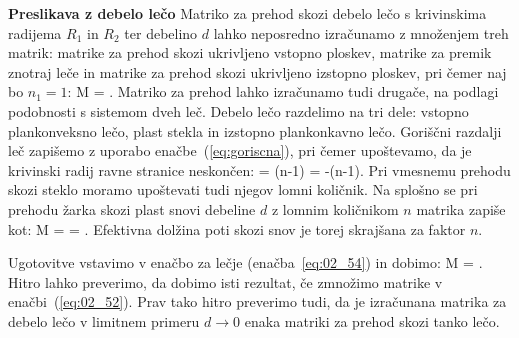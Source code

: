 \begin{example}{\bf Preslikava z debelo lečo}
Matriko za prehod skozi debelo lečo s krivinskima radijema
$R_1$ in $R_2$ ter debelino $d$ lahko neposredno izračunamo
z množenjem treh matrik: matrike za prehod skozi ukrivljeno vstopno 
ploskev, matrike za premik znotraj leče in matrike za prehod skozi 
ukrivljeno izstopno ploskev, pri čemer naj bo $n_1 = 1$:
\beq
M = 
\cdot
\left[\begin{array}{cc}
1& d\\
0&1
\end{array}\right]
\cdot
{}\!\!.
\label{eq:02_52}
\eeq
Matriko za prehod lahko izračunamo tudi drugače, na podlagi podobnosti 
s sistemom dveh leč. Debelo lečo razdelimo
na tri dele: vstopno plankonveksno lečo, plast stekla in izstopno plankonkavno lečo.
Goriščni razdalji leč zapišemo z uporabo enačbe~(\ref{eq:goriscna}), pri čemer upoštevamo, 
da je krivinski radij ravne stranice neskončen:
\beq
{} = (n-1)\qquad {} \qquad {} = -(n-1).
\label{eq:02_53}
\eeq
Pri vmesnemu prehodu skozi steklo moramo upoštevati tudi njegov
lomni količnik. Na splošno se pri prehodu žarka skozi plast snovi debeline $d$
z lomnim količnikom $n$ matrika zapiše kot:
\beq
M = 
\left[\begin{array}{cc}
1& 0\\
0&n
\end{array}\right]\cdot
\left[\begin{array}{cc}
1& d\\
0&1
\end{array}\right]\cdot
{} = 
\!\!.
\label{eq:02_54a}
\eeq
Efektivna dolžina poti skozi snov je torej skrajšana za faktor $n$.

Ugotovitve vstavimo v enačbo za lečje (enačba~\ref{eq:02_54}) in dobimo:
\beq
M = 
\!\!.
\label{eq:02_53a}
\eeq
Hitro lahko preverimo, da dobimo isti rezultat, če zmnožimo matrike v enačbi~(\ref{eq:02_52}).
Prav tako hitro preverimo tudi, da je izračunana matrika za debelo lečo v limitnem 
primeru $d \to 0$ enaka matriki za prehod skozi tanko lečo. 
\end{example}

